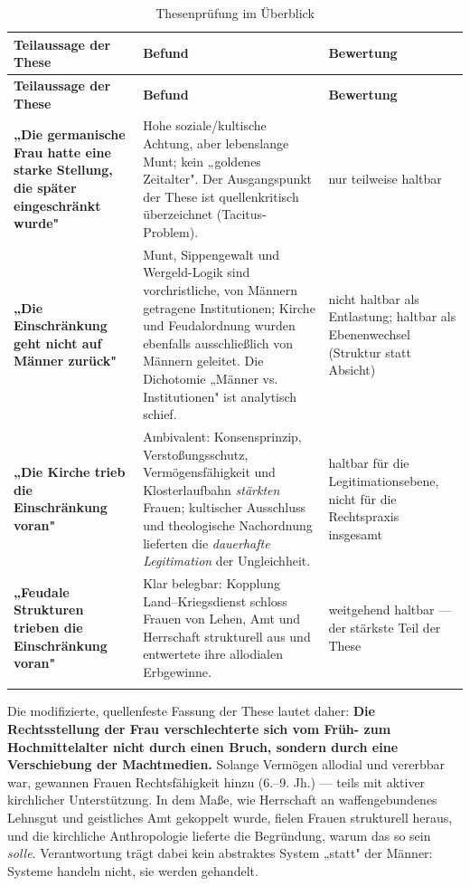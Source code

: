 \documentclass[11pt,a4paper,ngerman]{scrartcl}
\newcommand{\chipbase}[2]{\hspace{0pt}{\footnotesize\textcolor{#1}{[\textsc{#2}]}}}
\newcommand{\chipplausibel}[1]{\chipbase{chipamber}{#1}}
\begin{document}
\begin{small}
\begin{longtable}{>{\raggedright\arraybackslash}p{}>{\raggedright\arraybackslash}p{}>{\raggedright\arraybackslash}p{}}
\caption{Thesenprüfung im Überblick}\\
\toprule
\textbf{Teilaussage der These} & \textbf{Befund} & \textbf{Bewertung} \\
\midrule
\endfirsthead
\toprule
\textbf{Teilaussage der These} & \textbf{Befund} & \textbf{Bewertung} \\
\midrule
\endhead
\textbf{„Die germanische Frau hatte eine starke Stellung, die später eingeschränkt wurde"} & Hohe soziale/kultische Achtung, aber lebenslange Munt; kein „goldenes Zeitalter". Der Ausgangspunkt der These ist quellenkritisch überzeichnet (Tacitus-Problem). & nur teilweise haltbar \\
\addlinespace[2pt]
\textbf{„Die Einschränkung geht nicht auf Männer zurück"} & Munt, Sippengewalt und Wergeld-Logik sind vorchristliche, von Männern getragene Institutionen; Kirche und Feudalordnung wurden ebenfalls ausschließlich von Männern geleitet. Die Dichotomie „Männer vs. Institutionen" ist analytisch schief. & nicht haltbar als Entlastung; haltbar als Ebenenwechsel (Struktur statt Absicht) \\
\addlinespace[2pt]
\textbf{„Die Kirche trieb die Einschränkung voran"} & Ambivalent: Konsensprinzip, Verstoßungsschutz, Vermögensfähigkeit und Klosterlaufbahn \emph{stärkten} Frauen; kultischer Ausschluss und theologische Nachordnung lieferten die \emph{dauerhafte Legitimation} der Ungleichheit. & haltbar für die Legitimationsebene, nicht für die Rechtspraxis insgesamt \\
\addlinespace[2pt]
\textbf{„Feudale Strukturen trieben die Einschränkung voran"} & Klar belegbar: Kopplung Land–Kriegsdienst schloss Frauen von Lehen, Amt und Herrschaft strukturell aus und entwertete ihre allodialen Erbgewinne. & weitgehend haltbar — der stärkste Teil der These \\
\addlinespace[2pt]
\bottomrule
\end{longtable}
\end{small}

Die modifizierte, quellenfeste Fassung der These lautet daher: \textbf{Die Rechtsstellung der Frau verschlechterte sich vom Früh- zum Hochmittelalter nicht durch einen Bruch, sondern durch eine Verschiebung der Machtmedien.} Solange Vermögen allodial und vererbbar war, gewannen Frauen Rechtsfähigkeit hinzu (6.–9. Jh.) — teils mit aktiver kirchlicher Unterstützung. In dem Maße, wie Herrschaft an waffengebundenes Lehnsgut und geistliches Amt gekoppelt wurde, fielen Frauen strukturell heraus, und die kirchliche Anthropologie lieferte die Begründung, warum das so sein \emph{solle}. Verantwortung trägt dabei kein abstraktes System „statt" der Männer: Systeme handeln nicht, sie werden gehandelt. \chipplausibel{plausibel}
\end{document}

